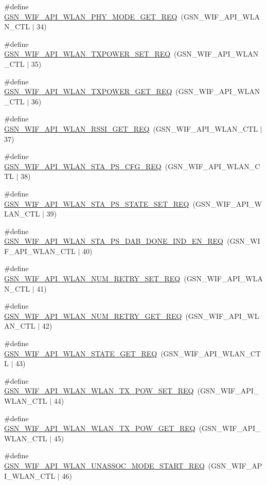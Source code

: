 \begin{DoxyCompactItemize}
\item 
\#define \hyperlink{a00606_aba4abf8270641c5b5a406a2648ec1f35}{GSN\_\-WIF\_\-API\_\-WLAN\_\-PHY\_\-MODE\_\-GET\_\-REQ}~(GSN\_\-WIF\_\-API\_\-WLAN\_\-CTL $|$ 34)
\item 
\#define \hyperlink{a00606_adc79bfe57e012e6c591f9f4faa5dc5c7}{GSN\_\-WIF\_\-API\_\-WLAN\_\-TXPOWER\_\-SET\_\-REQ}~(GSN\_\-WIF\_\-API\_\-WLAN\_\-CTL $|$ 35)
\item 
\#define \hyperlink{a00606_ac18b706325a23dd410bf82b1ccddf003}{GSN\_\-WIF\_\-API\_\-WLAN\_\-TXPOWER\_\-GET\_\-REQ}~(GSN\_\-WIF\_\-API\_\-WLAN\_\-CTL $|$ 36)
\item 
\#define \hyperlink{a00606_a7e180abfccc9e86d92337c61fea91008}{GSN\_\-WIF\_\-API\_\-WLAN\_\-RSSI\_\-GET\_\-REQ}~(GSN\_\-WIF\_\-API\_\-WLAN\_\-CTL $|$ 37)
\item 
\#define \hyperlink{a00606_a123c74a5314e0994fe78bd39d6ce8e62}{GSN\_\-WIF\_\-API\_\-WLAN\_\-STA\_\-PS\_\-CFG\_\-REQ}~(GSN\_\-WIF\_\-API\_\-WLAN\_\-CTL $|$ 38)
\item 
\#define \hyperlink{a00606_a5b4151a75aa80c25bfe4e7e8a7c0b30b}{GSN\_\-WIF\_\-API\_\-WLAN\_\-STA\_\-PS\_\-STATE\_\-SET\_\-REQ}~(GSN\_\-WIF\_\-API\_\-WLAN\_\-CTL $|$ 39)
\item 
\#define \hyperlink{a00606_ada95ef64874e794dadfcf53048e1676e}{GSN\_\-WIF\_\-API\_\-WLAN\_\-STA\_\-PS\_\-DAB\_\-DONE\_\-IND\_\-EN\_\-REQ}~(GSN\_\-WIF\_\-API\_\-WLAN\_\-CTL $|$ 40)
\item 
\#define \hyperlink{a00606_a2b11495e7a42ebe57c2dbb52caa174be}{GSN\_\-WIF\_\-API\_\-WLAN\_\-NUM\_\-RETRY\_\-SET\_\-REQ}~(GSN\_\-WIF\_\-API\_\-WLAN\_\-CTL $|$ 41)
\item 
\#define \hyperlink{a00606_aaa22a6abee1aef348294034350fb93c2}{GSN\_\-WIF\_\-API\_\-WLAN\_\-NUM\_\-RETRY\_\-GET\_\-REQ}~(GSN\_\-WIF\_\-API\_\-WLAN\_\-CTL $|$ 42)
\item 
\#define \hyperlink{a00606_aeb820162c0c23597e33fe405490eec14}{GSN\_\-WIF\_\-API\_\-WLAN\_\-STATE\_\-GET\_\-REQ}~(GSN\_\-WIF\_\-API\_\-WLAN\_\-CTL $|$ 43)
\item 
\#define \hyperlink{a00606_a966d1c5a360a22f0bc4666e1999f1627}{GSN\_\-WIF\_\-API\_\-WLAN\_\-WLAN\_\-TX\_\-POW\_\-SET\_\-REQ}~(GSN\_\-WIF\_\-API\_\-WLAN\_\-CTL $|$ 44)
\item 
\#define \hyperlink{a00606_a0f5d7572b7b55ea1ef95405de1a96c6f}{GSN\_\-WIF\_\-API\_\-WLAN\_\-WLAN\_\-TX\_\-POW\_\-GET\_\-REQ}~(GSN\_\-WIF\_\-API\_\-WLAN\_\-CTL $|$ 45)
\item 
\#define \hyperlink{a00606_a083be1997e604c2fd50a5f603933d9c1}{GSN\_\-WIF\_\-API\_\-WLAN\_\-UNASSOC\_\-MODE\_\-START\_\-REQ}~(GSN\_\-WIF\_\-API\_\-WLAN\_\-CTL $|$ 46)

\end{DoxyCompactItemize}
